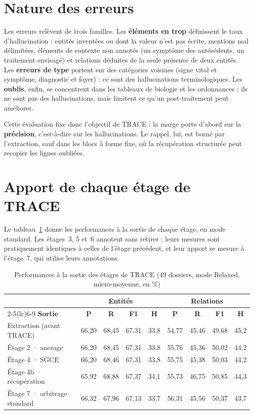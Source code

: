 \section{Nature des erreurs}\label{sec:c6-erreurs}\label{sec:c6-discussion}

Les erreurs relèvent de trois familles. Les \textbf{éléments en trop} définissent le taux d'hallucination : entités inventées ou dont la valeur n'est pas écrite, mentions mal délimitées, éléments de contexte non annotés (un symptôme des antécédents, un traitement envisagé) et relations déduites de la seule présence de deux entités. Les \textbf{erreurs de type} portent sur des catégories voisines (signe vital et symptôme, diagnostic et foyer) : ce sont des hallucinations terminologiques. Les \textbf{oublis}, enfin, se concentrent dans les tableaux de biologie et les ordonnances ; ils ne sont pas des hallucinations, mais limitent ce qu'un post-traitement peut améliorer.

Cette évaluation fixe donc l'objectif de TRACE : la marge porte d'abord sur la \textbf{précision}, c'est-à-dire sur les hallucinations. Le rappel, lui, est borné par l'extraction, sauf dans les blocs à forme fixe, où la récupération structurée peut recopier les lignes oubliées.

\section{Apport de chaque étage de TRACE}\label{sec:c6-trace-etages}

Le tableau~\ref{tab:c6-etages} donne les performances à la sortie de chaque étage, en mode standard. Les étages~3, 5 et~6 annotent sans retirer : leurs mesures sont pratiquement identiques à celles de l'étage précédent, et leur apport se mesure à l'étage~7, qui utilise leurs annotations.

\begin{table}[H]
\centering
\caption{Performances à la sortie des étages de TRACE (49 dossiers, mode Relaxed, micro-moyenne, en \%)}\label{tab:c6-etages}
\small
\begin{tabular}{lcccccccc}
\toprule
& \multicolumn{4}{c}{\textbf{Entités}} & \multicolumn{4}{c}{\textbf{Relations}} \\
\cmidrule(lr){2-5}\cmidrule(lr){6-9}
\textbf{Sortie} & \textbf{P} & \textbf{R} & \textbf{F1} & \textbf{H} & \textbf{P} & \textbf{R} & \textbf{F1} & \textbf{H} \\
\midrule
Extraction (avant TRACE) & 66,20 & 68,45 & 67,31 & 33,8 & 54,77 & 45,46 & 49,68 & 45,2 \\
Étage 2 · ancrage & 66,20 & 68,45 & 67,31 & 33,8 & 55,76 & 45,36 & 50,02 & 44,2 \\
Étage 4 · SGCE & 66,20 & 68,46 & 67,31 & 33,8 & 55,75 & 45,38 & 50,03 & 44,2 \\
Étage 4b · récupération & 65,92 & 68,88 & 67,37 & 34,1 & 55,73 & 46,75 & 50,85 & 44,3 \\
Étage 7 · arbitrage standard & 66,32 & 67,96 & 67,13 & 33,7 & 56,31 & 45,56 & 50,37 & 43,7 \\
\bottomrule
\end{tabular}
\end{table}

